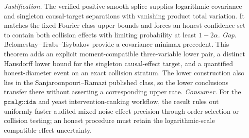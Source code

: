 \documentclass{article}
\begin{document}
\par\smallskip\noindent \textit{Justification.} The verified positive smooth splice supplies logarithmic covariance and singleton causal-target separations with vanishing product total variation. It matches the fixed Fourier-class upper bounds and forces an honest confidence set to contain both collision effects with limiting probability at least \(1-2\alpha\). \textit{Gap.} Belomestny--Trabs--Tsybakov provide a covariance minimax precedent. This theorem adds an explicit moment-compatible three-variable lower pair, a distinct Hausdorff lower bound for the singleton causal-effect target, and a quantified honest-diameter event on an exact collision stratum. The lower construction also lies in the Sanjaroonpouri--Ramazi published class, so the lower conclusions transfer there without asserting a corresponding upper rate. \textit{Consumer.} For the \(\texttt{pcalg::ida}\) and yeast intervention-ranking workflow, the result rules out uniformly faster audited mixed-noise effect precision through order selection or collision testing; an honest procedure must retain the logarithmic-scale compatible-effect uncertainty.
\end{document}
